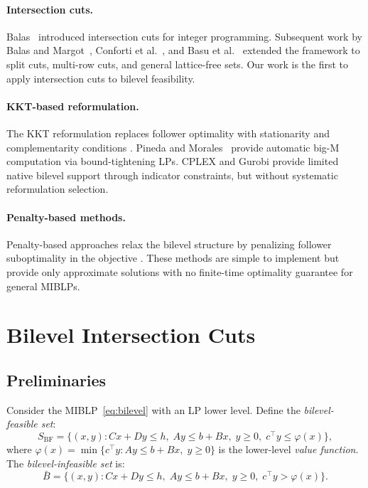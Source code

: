 \documentclass[11pt]{article}
\begin{document}
\paragraph{Intersection cuts.}
Balas~\cite{balas1971intersection} introduced intersection cuts for integer
programming. Subsequent work by Balas and Margot~\cite{balas2013intersection},
Conforti et al.~\cite{conforti2011cutting}, and Basu et al.~\cite{basu2010maximal}
extended the framework to split cuts, multi-row cuts, and general lattice-free
sets. Our work is the first to apply intersection cuts to bilevel feasibility.

\paragraph{KKT-based reformulation.}
The KKT reformulation replaces follower optimality with stationarity
and complementarity conditions \cite{dempe2002foundations, fortuny1981representation}.
Pineda and Morales~\cite{pineda2019solving} provide automatic big-M computation
via bound-tightening LPs. CPLEX and Gurobi provide limited native bilevel support
through indicator constraints, but without systematic reformulation selection.

\paragraph{Penalty-based methods.}
Penalty-based approaches relax the bilevel structure by penalizing follower
suboptimality in the objective \cite{white1993penalty, luo1996mathematical}.
These methods are simple to implement but provide only approximate solutions
with no finite-time optimality guarantee for general MIBLPs.

\section{Bilevel Intersection Cuts}
\label{sec:cuts}

\subsection{Preliminaries}

Consider the MIBLP~\eqref{eq:bilevel} with an LP lower level. Define the
\emph{bilevel-feasible set}:
\[
S_{\text{BF}} = \{(x,y) : Cx + Dy \leq h,\; Ay \leq b + Bx,\; y \geq 0,\;
c^\top y \leq \varphi(x)\},
\]
where $\varphi(x) = \min\{c^\top y : Ay \leq b + Bx,\; y \geq 0\}$ is the
lower-level \emph{value function}. The \emph{bilevel-infeasible set} is:
\[
\bar{B} = \{(x,y) : Cx + Dy \leq h,\; Ay \leq b + Bx,\; y \geq 0,\;
c^\top y > \varphi(x)\}.
\]
\end{document}
